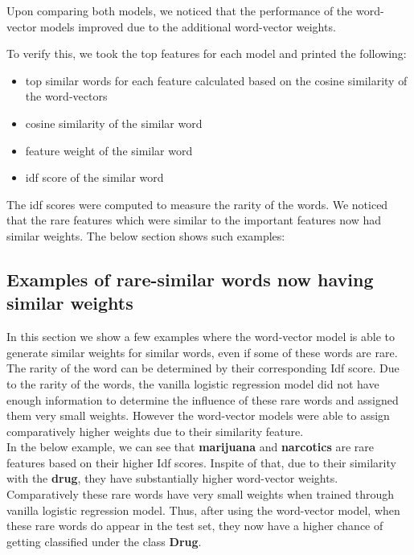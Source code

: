 Upon comparing both models, we noticed that the performance of the word-vector models improved due to the additional word-vector weights.

To verify this, we took the top features for each model and printed the following:

\begin{itemize}
\item top similar words for each feature calculated based on the cosine similarity of the word-vectors

\item cosine similarity of the similar word

\item feature weight of the similar word

\item idf score of the similar word
\end{itemize}

The idf scores were computed to measure the rarity of the words. We noticed that the rare features which were similar to the important features now had similar weights. The below section shows such examples:

\subsection{Examples of rare-similar words now having similar weights}

In this section we show a few examples where the word-vector model is able to generate similar weights for similar words, even if some of these words are rare. The rarity of the word can be determined by their corresponding Idf score. Due to the rarity of the words, the vanilla logistic regression model did not have enough information to determine the influence of these rare words and assigned them very small weights. However the word-vector models were able to assign comparatively higher weights due to their similarity feature. \\

In the below example, we can see that \textbf{marijuana} and \textbf{narcotics} are rare features based on their higher Idf scores. Inspite of that, due to their similarity with the \textbf{drug}, they have substantially higher word-vector weights. Comparatively these rare words have very small weights when trained through vanilla logistic regression model. Thus, after using the word-vector model, when these rare words do appear in the test set, they now have a higher chance of getting classified under the class \textbf{Drug}.

